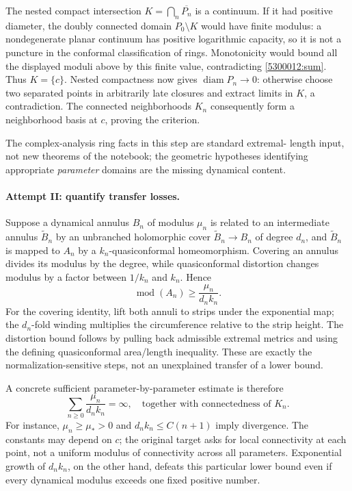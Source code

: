 \documentclass[11pt,a4paper]{article}
\numberwithin{equation}{section}
\begin{document}
The nested compact intersection $K=\bigcap_n\overline{P_n}$ is a
continuum.  If it had positive diameter, the doubly connected domain
$P_0\setminus K$ would have finite modulus: a nondegenerate planar
continuum has positive logarithmic capacity, so it is not a puncture
in the conformal classification of rings.  Monotonicity would bound
all the displayed moduli above by this finite value, contradicting
\eqref{5300012:sum}.  Thus $K=\{c\}$.  Nested compactness now gives
$\operatorname{diam}P_n\to0$: otherwise choose two separated points
in arbitrarily late closures and extract limits in $K$, a contradiction.
The connected neighborhoods $K_n$ consequently form a neighborhood
basis at $c$, proving the criterion.

The complex-analysis ring facts in this step are standard extremal-
length input, not new theorems of the notebook; the geometric
hypotheses identifying appropriate \emph{parameter} domains are the
missing dynamical content.

\paragraph{Attempt II: quantify transfer losses.}
Suppose a dynamical annulus $B_n$ of modulus $\mu_n$ is related to an
intermediate annulus $\widetilde B_n$ by an unbranched holomorphic
cover $\widetilde B_n\to B_n$ of degree $d_n$, and $\widetilde B_n$ is mapped to $A_n$ by a
$k_n$-quasiconformal homeomorphism.  Covering an annulus divides its
modulus by the degree, while quasiconformal distortion changes modulus
by a factor between $1/k_n$ and $k_n$.  Hence
\begin{equation}\label{5300012:loss}
 \operatorname{mod}(A_n)\geq\frac{\mu_n}{d_n k_n}.
\end{equation}
For the covering identity, lift both annuli to strips under the
exponential map; the $d_n$-fold winding multiplies the circumference
relative to the strip height.  The distortion bound follows by pulling
back admissible extremal metrics and using the defining quasiconformal
area/length inequality.  These are exactly the normalization-sensitive
steps, not an unexplained transfer of a lower bound.

A concrete sufficient parameter-by-parameter estimate is therefore
\begin{equation}\label{5300012:target}
 \sum_{n\geq0}\frac{\mu_n}{d_n k_n}=\infty,
 \quad\text{together with connectedness of }K_n.
\end{equation}
For instance, $\mu_n\geq\mu_*>0$ and
$d_nk_n\leq C(n+1)$ imply divergence.  The constants may depend on
$c$; the original target asks for local connectivity at each point,
not a uniform modulus of connectivity across all parameters.
Exponential growth of $d_nk_n$, on the other hand, defeats this
particular lower bound even if every dynamical modulus exceeds one
fixed positive number.
\end{document}

